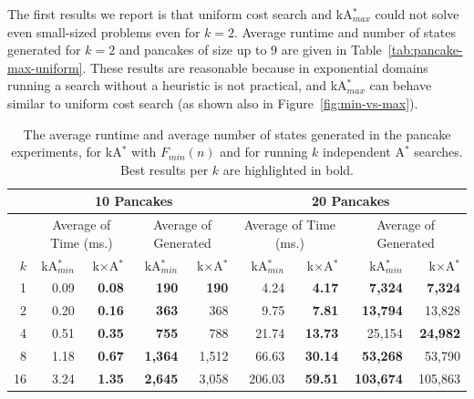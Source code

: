 \documentclass{aicom2e}
\newcommand{\astar}{A$^*$}
\newcommand{\kastar}{kA$^*$}
\newcommand{\kastarmin}{kA$^*_{min}$}
\newcommand{\kastarmax}{kA$^*_{max}$}
\newcommand{\kxastar}{k$\times$A$^*$}
\newcommand{\minf}{$F_{min}(n)$}
\begin{document}
The first results we report is that uniform cost search and \kastarmax{}
could not solve even small-sized problems even for $k=2$. Average runtime and number of states generated  for $k=2$ and pancakes of size up to 9 are given in Table~\ref{tab:pancake-max-uniform}. These results are reasonable because in exponential domains running a search without a heuristic is not practical, and \kastarmax{} can behave similar to uniform cost search (as shown also in Figure~\ref{fig:min-vs-max}).


\begin{table}[]


            \centering
        \begin{tabular}{|r|r|r|r|r|r|r|r|r|}
            \hline
            & \multicolumn{4}{c|}{{\bf 10 Pancakes}} & \multicolumn{4}{c|}{{\bf 20 Pancakes}}    \\
            \hline
            & \multicolumn{2}{c|}{Average of Time (ms.)}   & \multicolumn{2}{c|}{Average of Generated}    & \multicolumn{2}{c|}{Average of Time (ms.)}   & \multicolumn{2}{c|}{Average of Generated}    \\
            \hline
            $k$ & \kastarmin{} & \kxastar{} & \kastarmin{} & \kxastar{} & \kastarmin{} & \kxastar{} & \kastarmin{} & \kxastar{}  \\ \hline

1           & 0.09                  & \textbf{0.08}       & \textbf{190}          & \textbf{190}        & 4.24                  & \textbf{4.17}       & \textbf{7,324}        & \textbf{7,324}      \\
2           & 0.20                  & \textbf{0.16}       & \textbf{363}          & 368                 & 9.75                  & \textbf{7.81}       & \textbf{13,794}       & 13,828              \\
4           & 0.51                  & \textbf{0.35}       & \textbf{755}          & 788                 & 21.74                 & \textbf{13.73}      & 25,154                & \textbf{24,982}     \\
8           & 1.18                  & \textbf{0.67}       & \textbf{1,364}        & 1,512               & 66.63                 & \textbf{30.14}      & \textbf{53,268}       & 53,790              \\
16          & 3.24                  & \textbf{1.35}       & \textbf{2,645}        & 3,058               & 206.03                & \textbf{59.51}      & \textbf{103,674}       & 105,863     \\ \hline
    \end{tabular}
    \caption{The average runtime and average number of states generated in the pancake experiments, for \kastar{} with \minf{} and for running $k$ independent \astar{} searches. Best results per $k$ are highlighted in bold.}
    \label{tab:pancake-minf-k-searches}
  \end{table}
\end{document}
